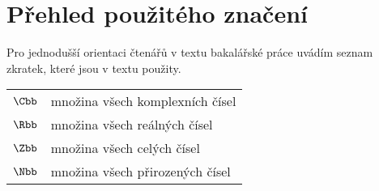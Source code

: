 \chapter*{Přehled použitého značení}

Pro jednodušší orientaci čtenářů v textu bakalářské práce uvádím seznam zkratek, které jsou v textu použity.
\begin{flushleft}
\begin{longtable}[l]{ll} %
  $\Cbb$                 & množina všech komplexních čísel \\[1mm]
  $\Rbb$                 & množina všech reálných čísel \\[1mm]
  $\Zbb$                 & množina všech celých čísel \\[1mm]
  $\Nbb$                 & množina všech přirozených čísel\\[1mm]

\end{longtable}
\end{flushleft}
